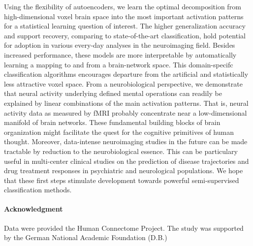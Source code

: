 \documentclass{article} %
\begin{document}
Using the flexibility of autoencoders, we
learn the optimal decomposition from high-dimensional
voxel brain space into the most important activation patterns for a
statistical learning question of interest.
The higher generalization accuracy and support recovery, comparing to
state-of-the-art classification, hold potential
for adoption in various every-day analyses in the neuroimaging field.
Besides increased performance, these models are more interpretable by
automatically learning a mapping to and from a brain-network space.
This domain-specifc classification algorithms
encourages departure from the artificial and statistically
less attractive voxel space.
From a neurobiological perspective,
we demonstrate that neural activity underlying defined mental operations
can readily be explained by linear combinations of the main activation
patterns. That is,
neural activity data as measured by fMRI probably concentrate near
a low-dimensional manifold of brain networks.
These fundamental building blocks of brain organization might
facilitate the quest for the cognitive primitives of
human thought.
Moreover, data-intense neuroimaging studies in the future can be made tractable
by reduction to the neurobiological essence.
This can be particulary useful in multi-center clinical studies
on the prediction of disease trajectories and drug treatment responses
in psychiatric and neurological populations.
We hope that these first steps stimulate development towards
powerful semi-supervised classification methods.

\paragraph{Acknowledgment}
{\small
Data were provided the Human Connectome Project. The study was supported
by the German National Academic Foundation (D.B.)}

\small


\end{document}
